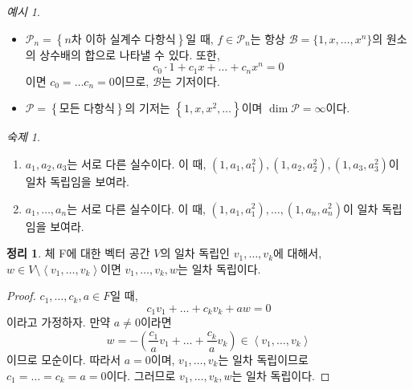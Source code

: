 \documentclass[unfonts,oneside,a4paper]{oblivoir}
\theoremstyle{definition}
\theoremstyle{theorem}
\newtheorem{theorem}{정리}
\theoremstyle{remark}
\theoremstyle{remark}
\theoremstyle{remark}
\newtheorem*{example}{예시}
\theoremstyle{remark}
\newtheorem*{homework}{숙제}
\renewcommand{\vec}[1]{\bm{\mathit{#1}}}
\newcommand{\vecz}{\bm{\mathrm{0}}}
\begin{document}
\begin{example}
    \leavevmode
    \begin{itemize}
        \item $\mathcal P_n = \left\{n\text{차 이하 실계수 다항식}\right\}$일 때, $f \in \mathcal P_n$는 항상 $\mathcal B = \{1, x, \dots, x^n\}$의 원소의 상수배의 합으로 나타낼 수 있다.
            또한,
            \[
                c_0 \cdot 1 + c_1 x + \dots + c_n x^n = 0
            \]
            이면 $c_0 = \dots c_n = 0$이므로, $\mathcal B$는 기저이다.
        \item $\mathcal P = \left\{\text{모든 다항식}\right\}$의 기저는 $\left\{1, x, x^2, \dots\right\}$이며 $\dim \mathcal{P} = \infty$이다.
    \end{itemize}
\end{example}

\begin{homework}
    \leavevmode
    \begin{enumerate}
        \item $a_1, a_2, a_3$는 서로 다른 실수이다.
            이 때, $\left(1, a_1, a_1^2\right), \left(1, a_2, a_2^2\right), \left(1, a_3, a_3^2\right)$이 일차 독립임을 보여라.
        \item $a_1, \dots, a_n$는 서로 다른 실수이다.
            이 때, $\left(1, a_1, a_1^2\right), \dots, \left(1, a_n, a_n^2\right)$이 일차 독립임을 보여라.
    \end{enumerate}
\end{homework}

\begin{theorem}\label{thm:independence}
    체 F에 대한 벡터 공간 $V$의 일차 독립인 $\vec v_1, \dots, \vec v_k$에 대해서, $\vec w \in V \setminus \left<\vec v_1 , \dots, \vec v_k\right>$이면 $\vec v_1, \dots, \vec v_k, \vec w$는 일차 독립이다.
\end{theorem}

\begin{proof}
    $c_1, \dots, c_k, a \in F$일 때,
    \[
        c_1 \vec v_1 + \dots + c_k \vec v_k + a \vec w = \vecz
    \]
    이라고 가정하자.
    만약 $a \neq 0$이라면 
    \[
        \vec w = -\left(\frac{c_1}{a} \vec v_1 + \dots + \frac{c_k}{a} \vec v_k\right) \in \left<\vec v_1, \dots, \vec v_k\right>
    \]
    이므로 모순이다.
    따라서 $a = 0$이며, $\vec v_1, \dots, \vec v_k$는 일차 독립이므로 $c_1 = \dots = c_k = a = 0$이다.
    그러므로 $\vec v_1, \dots, \vec v_k, \vec w$는 일차 독립이다.
\end{proof}
\end{document}
